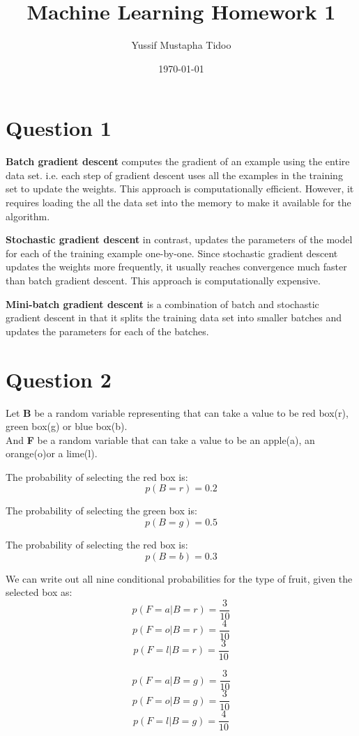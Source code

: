 \documentclass[a4paper, 12pt]{article}
\title{Machine Learning Homework 1}
\author{Yussif Mustapha Tidoo}
\date{\today}
\begin{document}
\maketitle

\section*{Question 1}

\textbf{Batch gradient descent} computes the gradient of an example using the entire data set. i.e. each step of gradient descent uses all the examples in the training set to update the weights. This approach is computationally efficient. However, it requires loading the all the data set into the memory to make it available for the algorithm. 

\textbf{Stochastic gradient descent} in contrast, updates the parameters of the model for each of the training example one-by-one. Since stochastic gradient descent updates the weights more frequently, it usually reaches convergence much faster than batch gradient descent. This approach is computationally expensive. 

\textbf{Mini-batch gradient descent} is a combination of batch and stochastic gradient descent in that it splits the training data set into smaller batches and updates the parameters for each of the batches. 

\section*{Question 2}

Let \textbf{B} be a random variable representing that can take a value to be red box(r), green box(g) or blue box(b). \\And \textbf{F} be a random variable that can take a value to be an apple(a), an orange(o)or a lime(l).

The probability of selecting the red box is: 
$$p(B = r) = 0.2$$ 

The probability of selecting the green box is:
$$p(B = g) = 0.5$$ 
 
The probability of selecting the red box is: 
$$p(B = b) = 0.3$$ 

We can write out all nine conditional probabilities for the type of fruit, given the selected box as: 
$$p(F=a|B = r) = \frac{3}{10}$$
$$p(F=o|B = r) = \frac{4}{10}$$
$$p(F=l|B = r) = \frac{3}{10}$$

$$p(F=a|B = g) = \frac{3}{10}$$
$$p(F=o|B = g)= \frac{3}{10}$$
$$p(F=l|B = g) = \frac{4}{10}$$
\end{document}
